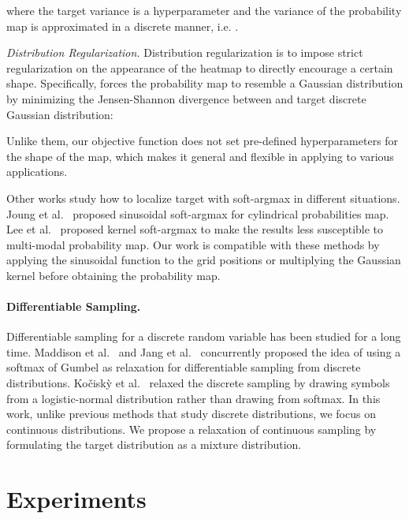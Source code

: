 \documentclass{article}
\begin{document}
where the target variance  is a hyperparameter and the variance of the probability map  is approximated in a discrete manner, i.e. .

\textit{Distribution Regularization.} Distribution regularization is to impose strict regularization on the appearance of the heatmap to directly encourage a certain shape. Specifically, \cite{nibali2018numerical} forces the probability map to resemble a Gaussian distribution by minimizing the Jensen-Shannon divergence between  and target discrete Gaussian distribution:


Unlike them, our objective function does not set pre-defined hyperparameters for the shape of the map, which makes it general and flexible in applying to various applications.


Other works \cite{joung2020cylindrical,lee2019sfnet} study how to localize target with soft-argmax in different situations. Joung et al.~\cite{joung2020cylindrical} proposed sinusoidal soft-argmax for cylindrical probabilities map. Lee et al.~\cite{lee2019sfnet} proposed kernel soft-argmax to make the results less susceptible to multi-modal probability map. Our work is compatible with these methods by applying the sinusoidal function to the grid positions or multiplying the Gaussian kernel before obtaining the probability map.

\paragraph{Differentiable Sampling.}
Differentiable sampling for a discrete random variable has been studied for a long time. Maddison et al.~\cite{maddison2016concrete} and Jang et al.~\cite{jang2016categorical} concurrently proposed the idea of using a softmax of Gumbel as relaxation for differentiable sampling from discrete distributions. Ko{\v{c}}isk{\`y} et al.~\cite{kovcisky2016semantic} relaxed the discrete sampling by drawing symbols from a logistic-normal distribution rather than drawing from softmax. In this work, unlike previous methods that study discrete distributions, we focus on continuous distributions. We propose a relaxation of continuous sampling by formulating the target distribution as a mixture distribution.



 
\section{Experiments}
\label{sec:exp}
\end{document}
